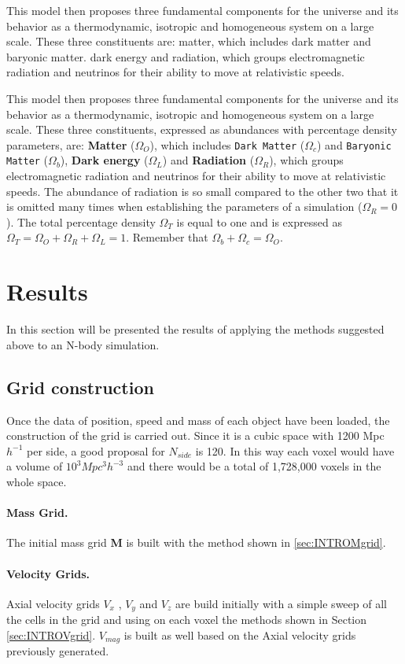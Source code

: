 \documentclass[a4paper,fleqn,usenatbib]{mnras}
\begin{document}
This model then proposes three fundamental components for the universe and its behavior as a thermodynamic, isotropic and homogeneous system on a large scale. These three constituents are: matter, which includes dark matter and baryonic matter. dark energy and radiation, which groups electromagnetic radiation and neutrinos for their ability to move at relativistic speeds.

This model then proposes three fundamental components for the universe and its behavior as a thermodynamic, isotropic and homogeneous system on a large scale\cite{CARROLL}. These three constituents, expressed as abundances with percentage density parameters, are: \textbf{Matter} (\textbf{$\Omega_O$}), which includes \texttt{Dark Matter} (\textbf{$\Omega_c$}) and \texttt{Baryonic Matter} (\textbf{$\Omega_b$}), \textbf{Dark energy} (\textbf{$\Omega_L$}) and \textbf{Radiation} (\textbf{$\Omega_R$}), which groups electromagnetic radiation and neutrinos for their ability to move at relativistic speeds. The abundance of radiation is so small compared to the other two that it is omitted many times when establishing the parameters of a simulation  (\textbf{$\Omega_R = 0$}). The total percentage density $\Omega_T$ is equal to one and is expressed as $\Omega_T = \Omega_O + \Omega_R + \Omega_L = 1$. Remember that $\Omega_b + \Omega_c = \Omega_O$. 
\section{Results}
In this section will be presented the results of applying the methods suggested above to an N-body simulation. 

\subsection{Grid construction}
Once the data of position, speed and mass of each object have been loaded, the construction of the grid is carried out. Since it is a cubic space with 1200 Mpc $h^{-1}$ per side, a good proposal for $N_{side}$ is 120. In this way each voxel would have a volume of $10^3 Mpc^{3}h^{-3}$ and there would be a total of 1,728,000 voxels in the whole space. 

\paragraph{Mass Grid.} The initial mass grid \textbf{M} is built with the method shown in \ref{sec:INTROMgrid}.
\paragraph{Velocity Grids.} Axial velocity grids \textbf{$V_{x}$} , \textbf{$V_{y}$} and \textbf{$V_{z}$} are build initially with a simple sweep of all the cells in the grid and using on each voxel the methods shown in Section \ref{sec:INTROVgrid}. \textbf{$V_{mag}$} is built as well based on the Axial velocity grids previously generated.  
\end{document}
